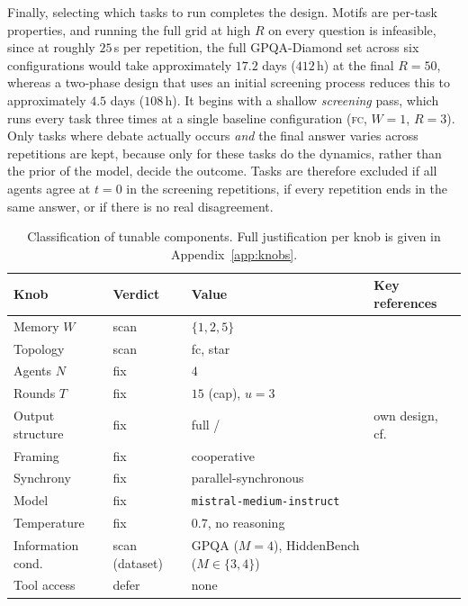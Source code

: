 Finally, selecting which tasks to run completes the design. Motifs are per-task properties, and running the full grid at high $R$ on every
question is infeasible, since at roughly $25$\,s per repetition, the full GPQA-Diamond
set across six configurations would take approximately $17.2$ days ($412$\,h) at the
final $R = 50$, whereas a two-phase design that uses an initial screening process 
reduces this to approximately $4.5$ days ($108$\,h). 
It begins with a shallow \emph{screening} pass, which runs every task three times at a
single baseline configuration (\textsc{fc}, $W = 1$, $R = 3$). Only tasks where
debate actually occurs \emph{and} the final answer varies across repetitions are
kept, because only for these tasks do the dynamics, rather than the prior of the model,
decide the outcome. Tasks are therefore excluded if all agents agree at $t = 0$ in the screening repetitions,
if every repetition ends in the same answer, or if there is no real disagreement.

\begin{table}[H]
\centering
\small
\begin{tabular}{p{3.0cm}lp{4.4cm}p{4.8cm}}
\toprule
\textbf{Knob} & \textbf{Verdict} & \textbf{Value} & \textbf{Key references} \\
\midrule
Memory $W$ & scan & $\{1, 2, 5\}$ & \citep{mehdizadeh2026topologymemory, marandi2026protocols, du2024improving} \\
Topology & scan & fc, star & \citep{conformitydynamics2026, chen2023consensus, liu2025problemsolving} \\
Agents $N$ & fix & $4$ & \citep{du2024improving, li2026hiddenbench} \\
Rounds $T$ & fix & $15$ (cap), $u=3$ & \citep{kaesberg2025voting, yang2025revisiting} \\
Output structure & fix & full \arguephase{}/\updatephase{} & own design, cf.\ \citet{he2025dimo} \\
Framing & fix & cooperative & \citep{liang2024encouraging} \\
Synchrony & fix & parallel-synchronous & \citep{chan2024chateval} \\
Model & fix & \texttt{mistral-medium-instruct} & \citep{liu2025stopovervaluing, wynn2025talk} \\
Temperature & fix & $0.7$, no reasoning & \citep{zhu2026demystifying} \\
Information cond. & scan (dataset) & GPQA ($M{=}4$), HiddenBench ($M{\in}\{3,4\}$) & \citep{li2026hiddenbench, stasser1985pooling} \\
Tool access & defer & none & \citep{rein2024gpqa} \\
\bottomrule
\end{tabular}
\caption[Classification of tunable components]{Classification of tunable components. Full justification per knob is
given in Appendix~\ref{app:knobs}.}
\label{tab:knob-summary}
\end{table}

